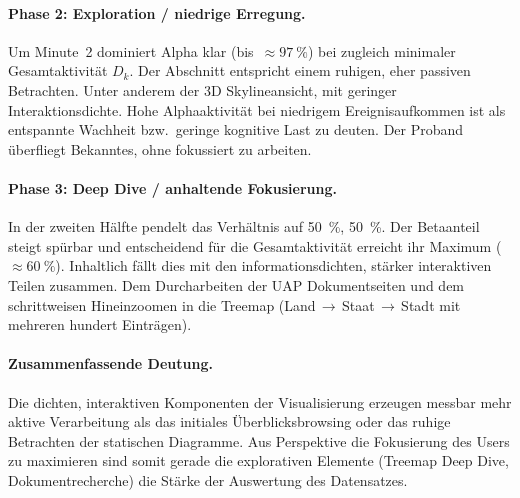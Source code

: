 \documentclass[11pt,a4paper]{article}
\begin{document}
\paragraph{Phase 2: Exploration / niedrige Erregung.}
Um Minute~2 dominiert Alpha klar (bis~$\approx\!\SI{97}{\percent}$) bei zugleich
minimaler Gesamtaktivit\"at $D_k$. Der Abschnitt entspricht einem ruhigen, eher
passiven Betrachten. Unter anderem der 3D Skylineansicht, mit geringer
Interaktionsdichte. Hohe Alphaaktivit\"at bei niedrigem Ereignisaufkommen ist als
entspannte Wachheit bzw.\ geringe kognitive Last zu deuten. Der Proband
\"uberfliegt Bekanntes, ohne fokussiert zu arbeiten.

\paragraph{Phase 3: Deep Dive / anhaltende Fokusierung.}
In der zweiten H\"alfte pendelt das Verh\"altnis auf \SI{50}{\percent}, \SI{50}{\percent}.
Der Betaanteil steigt sp\"urbar und entscheidend für die Gesamtaktivit\"at
erreicht ihr Maximum ($\approx\!\SI{60}{\percent}$). Inhaltlich f\"allt dies mit den
informationsdichten, st\"arker interaktiven Teilen zusammen. Dem Durcharbeiten der
UAP Dokumentseiten und dem schrittweisen Hineinzoomen in die Treemap
(Land\,$\to$\,Staat\,$\to$\,Stadt mit mehreren hundert Eintr\"agen).

\paragraph{Zusammenfassende Deutung.}
Die dichten, interaktiven Komponenten der Visualisierung erzeugen messbar
mehr aktive Verarbeitung als das
initiales Überblicksbrowsing oder das ruhige Betrachten der statischen Diagramme.
Aus Perspektive die Fokusierung des Users zu maximieren sind somit gerade die explorativen Elemente
(Treemap Deep Dive, Dokumentrecherche) die Stärke der Auswertung des Datensatzes.
\end{document}
